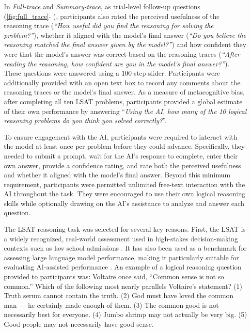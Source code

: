 \documentclass[manuscript, anonymous=false,authorversion,review=false]{acmart}
\newcommand{\blackcircled}[1]{%
  \tikz[baseline=(char.base)]{
    \node[circle,fill=black,text=white,inner sep=.5pt] (char) {\textbf{\sffamily #1}};
  }%
}
\begin{document}
In \textit{Full-trace} and \textit{Summary-trace}, as trial-level follow-up questions (\autoref{fig:full_trace}-\blackcircled{F}), participants also rated the perceived usefulness of the reasoning trace (\textit{``How useful did you find the reasoning for solving the problem?''}), whether it aligned with the model's final answer (\textit{``Do you believe the reasoning matched the final answer given by the model?''}) and how confident they were that the model's answer was correct based on the reasoning traces (\textit{``After reading the reasoning, how confident are you in the model's final answer?''}). These questions were answered using a 100-step slider. Participants were additionally provided with an open text box to record any comments about the reasoning traces or the model's final answer. As a measure of metacognitive bias, after completing all ten LSAT problems, participants provided a global estimate of their own performance by answering ``\textit{Using the AI, how many of the 10 logical reasoning problems do you think you solved correctly?}''.

To ensure engagement with the AI, participants were required to interact with the model at least once per problem before they could advance. Specifically, they needed to submit a prompt, wait for the AI's response to complete, enter their own answer, provide a confidence rating, and rate both the perceived usefulness and whether it aligned with the model's final answer. Beyond this minimum requirement, participants were permitted unlimited free-text interaction with the AI throughout the task. They were encouraged to use their own logical reasoning skills while optionally drawing on the AI's assistance to analyze and answer each question.

The LSAT reasoning task was selected for several key reasons. First, the LSAT is a widely recognized, real-world assessment used in high-stakes decision-making contexts such as law school admissions \cite{shultz2011predicting,wainer1995precision}. It has also been used as a benchmark for assessing large language model performance, making it particularly suitable for evaluating AI-assisted performance \cite{katz2024gpt}. An example of a logical reasoning question provided to participants was: Voltaire once said, ``Common sense is not so common.'' Which of the following most nearly parallels Voltaire's statement? (1) Truth serum cannot contain the truth. (2) God must have loved the common man --- he certainly made enough of them. (3) The common good is not necessarily best for everyone. (4) Jumbo shrimp may not actually be very big. (5) Good people may not necessarily have good sense.
\end{document}
